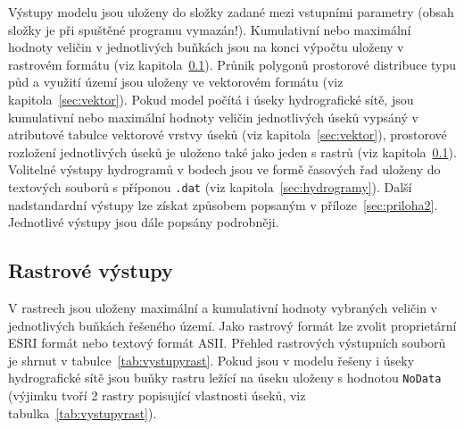 


Výstupy modelu jsou uloženy do složky zadané mezi vstupními parametry (obsah složky je při spuštěné programu vymazán!). Kumulativní nebo maximální hodnoty veličin v jednotlivých  buňkách jsou na konci výpočtu uloženy v rastrovém formátu (viz kapitola~\ref{sec:rastr}). Průnik polygonů prostorové distribuce typu půd a využití území jsou uloženy ve vektorovém formátu (viz kapitola~\ref{sec:vektor}). Pokud model \smod počítá i úseky hydrografické sítě, jsou kumulativní nebo maximální hodnoty veličin jednotlivých úseků vypsáný v atributové tabulce vektorové vrstvy úseků (viz kapitola~\ref{sec:vektor}), prostorové rozložení jednotlivých úseků je uloženo také jako jeden s rastrů (viz kapitola~\ref{sec:rastr}).  Volitelné výstupy hydrogramů  v bodech jsou ve formě časových řad uloženy do textových souborů s příponou {\tt.dat} (viz kapitola~\ref{sec:hydrogramy}). Další nadstandardní výstupy lze získat způsobem popsaným v příloze~\ref{sec:priloha2}. Jednotlivé výstupy jsou dále popsány podrobněji. 













\subsection{Rastrové výstupy}\label{sec:rastr}

V rastrech jsou uloženy maximální a kumulativní hodnoty vybraných veličin v jednotlivých buňkách řešeného území. Jako rastrový formát lze zvolit proprietární ESRI formát nebo textový formát ASII. Přehled rastrových výstupních souborů je shrnut v tabulce~\ref{tab:vystupyrast}. Pokud jsou v modelu řešeny i úseky hydrografické sítě jsou buňky rastru ležící na úseku uloženy s hodnotou {\tt NoData} (výjimku tvoří 2 rastry popisující vlastnosti úseků, viz tabulka~\ref{tab:vystupyrast}).  










